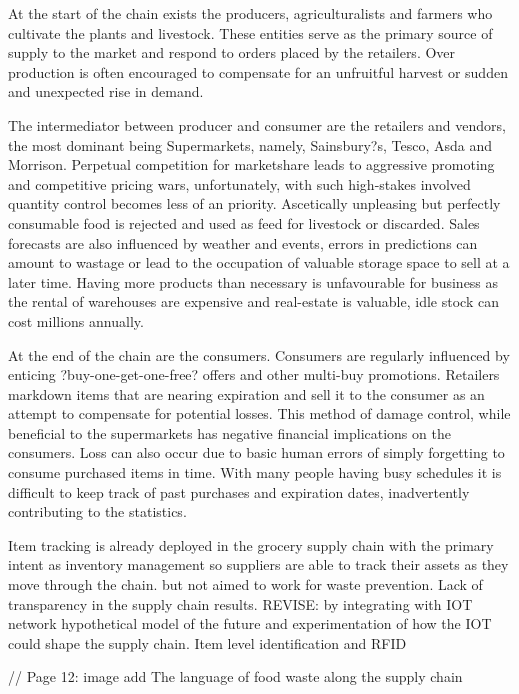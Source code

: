 \documentclass[a4paper, 11pt]{article}
\begin{document}
At the start of the chain exists the producers, agriculturalists and farmers who cultivate the plants and livestock. These entities serve as the primary source of supply to the market and respond to orders placed by the retailers. Over production is often encouraged to compensate for an unfruitful harvest or sudden and unexpected rise in demand. 

The intermediator between producer and consumer are the retailers and vendors, the most dominant being Supermarkets, namely, Sainsbury?s, Tesco, Asda and Morrison. Perpetual competition for marketshare leads to aggressive promoting and competitive pricing wars, unfortunately, with such high-stakes involved quantity control becomes less of an priority. Ascetically unpleasing but perfectly consumable food is rejected and used as feed for livestock or discarded. Sales forecasts are also influenced by weather and events, errors in predictions can amount to wastage or lead to the occupation of valuable storage space to sell at a later time. Having more products than necessary is unfavourable for business as the rental of warehouses are expensive and real-estate is valuable, idle stock can cost millions annually.

At the end of the chain are the consumers. Consumers are regularly influenced by enticing ?buy-one-get-one-free? offers and other multi-buy promotions. Retailers markdown items that are nearing expiration and sell it to the consumer as an attempt to compensate for potential losses. This method of damage control, while beneficial to the supermarkets has negative financial implications on the consumers. Loss can also occur due to basic human errors of simply forgetting to consume purchased items in time. With many people having busy schedules it is difficult to keep track of past purchases and expiration dates, inadvertently contributing to the statistics.

Item tracking is already deployed in the grocery supply chain with the primary intent as inventory management so suppliers are able to track their assets as they move through the chain.  but not aimed to work for waste prevention. Lack of transparency in the supply chain results. REVISE: by integrating with IOT network hypothetical model of the future and experimentation of how the IOT could shape the supply chain. Item level identification and RFID
\vspace{\baselineskip}

// Page 12: image add The language of food waste along the supply chain 
\vspace{\baselineskip}
\vspace{\baselineskip}
\vspace{\baselineskip}
\end{document}
